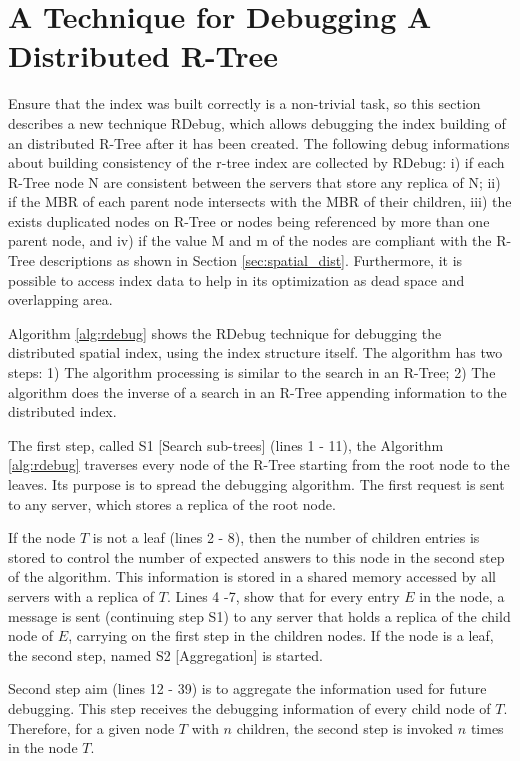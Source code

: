 \section{A Technique for Debugging A Distributed R-Tree}
\label{sec:rdebug}

Ensure that the index was built correctly is a non-trivial task, so this section describes a new technique RDebug, which allows debugging the index building of an distributed R-Tree after it has been created. 
The following debug informations about building consistency of the r-tree index are collected by RDebug: 
i) if each R-Tree node N are consistent between the servers that store any replica of N;
ii) if the MBR of each parent node intersects with the MBR of their children, 
iii) the exists duplicated nodes on R-Tree or nodes being referenced by more than one parent node, and 
iv) if the value M and m of the nodes are compliant with the R-Tree descriptions as shown in Section \ref{sec:spatial_dist}. 
Furthermore, it is possible to access index data to help in its optimization as dead space and overlapping area.

Algorithm \ref{alg:rdebug} shows the RDebug technique for debugging the distributed spatial index, using the index structure itself. The algorithm has two steps:
1) The algorithm processing is similar to the search in an R-Tree; 2) The algorithm does the inverse of a search in an R-Tree appending information to the distributed index.

The first step, called S1 [Search sub-trees] (lines 1 - 11), the Algorithm \ref{alg:rdebug} traverses every node of the R-Tree starting from the root node to the leaves. Its purpose is to spread the debugging algorithm. 
The first request is sent to any server, which stores a replica of the root node.

If the node $T$ is not a leaf (lines 2 - 8), then the number of children entries is stored to control the number of expected answers to this node in the second step of the algorithm. 
This information is stored in a shared memory accessed by all servers with a replica of $T$. Lines 4 -7, show that for every entry $E$ in the node, 
a message is sent (continuing step S1) to any server that holds a replica of the child node of $E$, carrying on the first step in the children nodes. 
If the node is a leaf, the second step, named S2 [Aggregation] is started.

Second step aim (lines 12 - 39) is to aggregate the information used for future debugging. This step receives the debugging information of every child node of $T$. 
Therefore, for a given node $T$ with $n$ children, the second step is invoked $n$ times in the node $T$.


